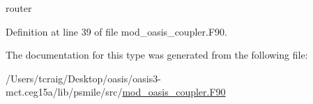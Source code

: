 router 



Definition at line 39 of file mod\+\_\+oasis\+\_\+coupler.\+F90.



The documentation for this type was generated from the following file\+:\begin{DoxyCompactItemize}
\item 
/\+Users/tcraig/\+Desktop/oasis/oasis3-\/mct.\+ceg15a/lib/psmile/src/\hyperlink{mod__oasis__coupler_8_f90}{mod\+\_\+oasis\+\_\+coupler.\+F90}\end{DoxyCompactItemize}

